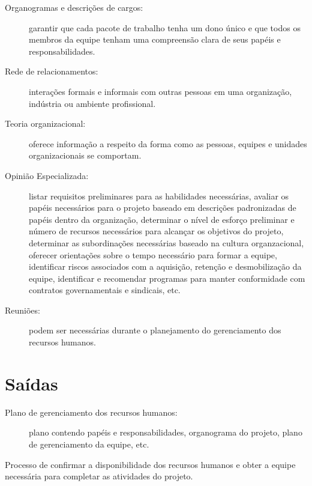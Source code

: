 \begin{description}

	\item[Organogramas e descrições de cargos:] garantir que cada pacote de trabalho tenha um dono único e que todos os membros da equipe tenham uma compreensão clara de seus papéis e responsabilidades.
	
	\item[Rede de relacionamentos:] interações formais e informais com outras pessoas em uma organização, indústria ou ambiente profissional.
	
	\item[Teoria organizacional:] oferece informação a respeito da forma como as pessoas, equipes e unidades organizacionais se comportam.
	
	\item[Opinião Especializada:] listar requisitos preliminares para as habilidades necessárias, avaliar os papéis necessários para o projeto baseado em descrições padronizadas de papéis dentro da organização, determinar o nível de esforço preliminar e número de recursos necessários para alcançar os objetivos do projeto, determinar as subordinações necessárias baseado na cultura organzacional, oferecer orientações sobre o tempo necessário para formar a equipe, identificar riscos associados com a aquisição, retenção e desmobilização da equipe, identificar e recomendar programas para manter conformidade com contratos governamentais e sindicais, etc.
	
	\item[Reuniões:] podem ser necessárias durante o planejamento do gerenciamento dos recursos humanos.
	

\end{description}

\section{Saídas}

\begin{description}
	
	\item[Plano de gerenciamento dos recursos humanos:] plano contendo papéis e responsabilidades, organograma do projeto, plano de gerenciamento da equipe, etc.	
	
\end{description}


Processo de confirmar a disponibilidade dos recursos humanos e obter a equipe necessária para completar as atividades do projeto.

